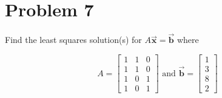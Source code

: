 \documentclass[letter,11pt]{article}
\theoremstyle{definition}
\begin{document}
\newpage
\section{Problem 7}
Find the least squares solution(s) for $A \vec{\boldsymbol{x}}=\vec{\boldsymbol{b}}$ where

$$ A=\begin{bmatrix} 1 & 1 & 0 \\ 1 & 1 & 0 \\ 1 & 0 & 1 \\ 1 & 0 & 1 \end{bmatrix} \text { and } \vec{\boldsymbol{b}}= \begin{bmatrix} 1 \\ 3 \\ 8 \\ 2 \end{bmatrix} $$
\end{document}
